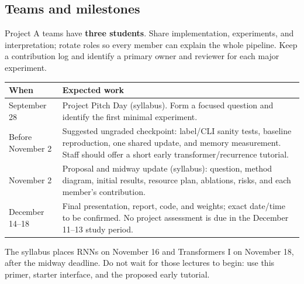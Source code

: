 \documentclass[11pt,letterpaper]{article}
\newcommand{\smallnote}[1]{{\small\color{graytext}#1\par}}
\begin{document}
\subsection{Teams and milestones}
Project A teams have \textbf{three students}. Share implementation, experiments, and interpretation; rotate roles so every member can explain the whole pipeline. Keep a contribution log and identify a primary owner and reviewer for each major experiment.
\begin{center}\small
\begin{tabularx}{\linewidth}{@{}p{1.25in}X@{}}
\toprule
When & Expected work\\\midrule
September 28 & Project Pitch Day (syllabus). Form a focused question and identify the first minimal experiment.\\
Before November 2 & Suggested ungraded checkpoint: label/CLI sanity tests, baseline reproduction, one shared update, and memory measurement. Staff should offer a short early transformer/recurrence tutorial.\\
November 2 & Proposal and midway update (syllabus): question, method diagram, initial results, resource plan, ablations, risks, and each member's contribution.\\
December 14--18 & Final presentation, report, code, and weights; exact date/time to be confirmed. No project assessment is due in the December 11--13 study period.\\
\bottomrule
\end{tabularx}\end{center}
\smallnote{The syllabus places RNNs on November 16 and Transformers I on November 18, after the midway deadline. Do not wait for those lectures to begin: use this primer, starter interface, and the proposed early tutorial.}
\end{document}
